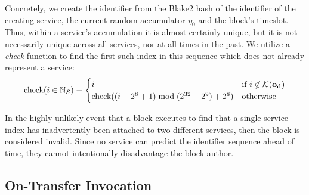 Concretely, we create the identifier from the Blake2 hash of the identifier of the creating service, the current random accumulator $\eta_0$ and the block's timeslot. Thus, within a service's accumulation it is almost certainly unique, but it is not necessarily unique across all services, nor at all times in the past. We utilize a \emph{check} function to find the first such index in this sequence which does not already represent a service:
\begin{equation}
  \text{check}(i \in \mathbb{N}_S) \equiv \begin{cases}
    i &\text{if } i \not\in \mathcal{K}(\mathbf{o}_\mathbf{d}) \\
    \text{check}((i - 2^8 + 1) \bmod (2^{32}-2^9) + 2^8)&\text{otherwise}
  \end{cases}
\end{equation}

\nb In the highly unlikely event that a block executes to find that a single service index has inadvertently been attached to two different services, then the block is considered invalid. Since no service can predict the identifier sequence ahead of time, they cannot intentionally disadvantage the block author.

\subsection{On-Transfer Invocation}\label{sec:ontransferinvocation}

